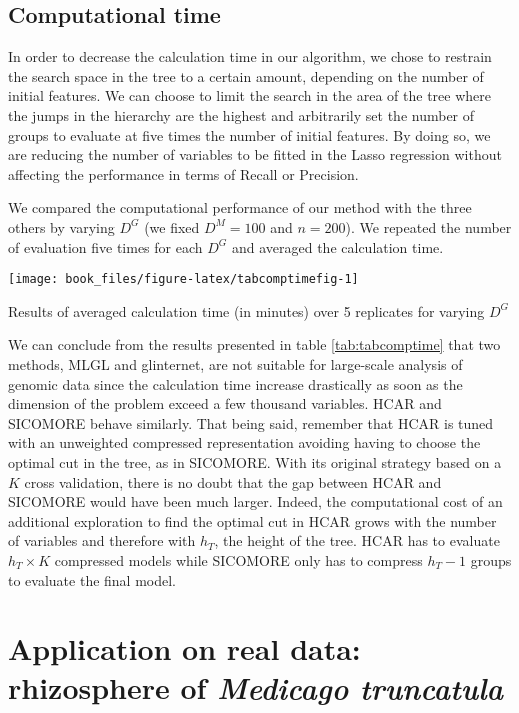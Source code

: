 \documentclass[]{book}
\begin{document}
\hypertarget{computational-time}{%
\subsection{Computational time}\label{computational-time}}

In order to decrease the calculation time in our algorithm, we chose to
restrain the search space in the tree to a certain amount, depending on
the number of initial features. We can choose to limit the search in the
area of the tree where the jumps in the hierarchy are the highest and
arbitrarily set the number of groups to evaluate at five times the
number of initial features. By doing so, we are reducing the number of
variables to be fitted in the Lasso regression without affecting the
performance in terms of Recall or Precision.

We compared the computational performance of our method with the three
others by varying \(D^{\mathit{G}}\) (we fixed \(D^{\mathit{M}} = 100\) and \(n = 200\)). We
repeated the number of evaluation five times for each \(D^{\mathit{G}}\) and
averaged the calculation time.

\begin{center}\texttt{[image: book\_files/figure-latex/tabcomptimefig-1]} \end{center}

\label{tab:tabcomptime}Results of averaged calculation time (in minutes) over 5 replicates for varying \(D^{\mathit{G}}\)

We can conclude from the results presented in table \ref{tab:tabcomptime} that
two methods, MLGL and glinternet, are not suitable for large-scale
analysis of genomic data since the calculation time increase drastically
as soon as the dimension of the problem exceed a few thousand variables.
HCAR and SICOMORE behave similarly. That being said, remember that HCAR
is tuned with an unweighted compressed representation avoiding having to
choose the optimal cut in the tree, as in SICOMORE. With its original
strategy based on a \(K\) cross validation, there is no doubt that the gap
between HCAR and SICOMORE would have been much larger. Indeed, the
computational cost of an additional exploration to find the optimal cut
in HCAR grows with the number of variables and therefore with \(h_T\), the
height of the tree. HCAR has to evaluate \(h_T \times K\) compressed
models while SICOMORE only has to compress \(h_T-1\) groups to evaluate
the final model.

\hypertarget{XPINRA}{%
\section{\texorpdfstring{Application on real data: rhizosphere of \emph{Medicago truncatula}}{Application on real data: rhizosphere of Medicago truncatula}}\label{XPINRA}}
\end{document}
